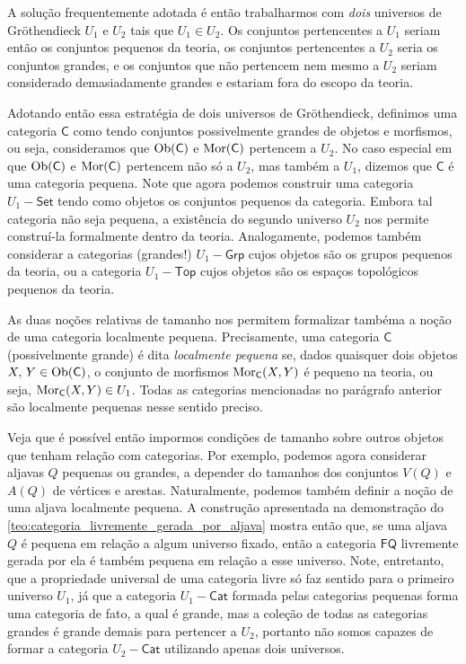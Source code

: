 \begin{obs}
    A solução frequentemente adotada é então trabalharmos com \emph{dois} universos de Gröthendieck $U_1$ e $U_2$ tais que $U_1 \in U_2$.
    Os conjuntos pertencentes a $U_1$ seriam então os conjuntos pequenos da teoria, os conjuntos pertencentes a $U_2$ seria os conjuntos grandes, e os conjuntos que não pertencem nem mesmo a $U_2$ seriam considerado demasiadamente grandes e estariam fora do escopo da teoria.

    Adotando então essa estratégia de dois universos de Gröthendieck, definimos uma categoria $\mathsf{C}$ como tendo conjuntos possivelmente grandes de objetos e morfismos, ou seja, consideramos que $\mathrm{Ob}(\mathsf{C})$ e $\mathrm{Mor}(\mathsf{C})$ pertencem a $U_2$.
    No caso especial em que $\mathrm{Ob}(\mathsf{C})$ e $\mathrm{Mor}(\mathsf{C})$ pertencem não só a $U_2$, mas também a $U_1$, dizemos que $\mathsf{C}$ é uma categoria pequena.
    Note que agora podemos construir uma categoria $U_1-\mathsf{Set}$ tendo como objetos os conjuntos pequenos da categoria.
    Embora tal categoria não seja pequena, a existência do segundo universo $U_2$ nos permite construí-la formalmente dentro da teoria.
    Analogamente, podemos também considerar a categorias (grandes!) $U_1-\mathsf{Grp}$ cujos objetos são os grupos pequenos da teoria, ou a categoria $U_1-\mathsf{Top}$ cujos objetos são os espaços topológicos pequenos da teoria.

    As duas noções relativas de tamanho nos permitem formalizar tambéma a noção de uma categoria localmente pequena.
    Precisamente, uma categoria $\mathsf{C}$ (possivelmente grande) é dita \emph{localmente pequena} se, dados quaisquer dois objetos $X,\, Y \in \mathrm{Ob}(\mathsf{C})$, o conjunto de morfismos $\mathrm{Mor}_{\mathsf{C}}(X,Y)$ é pequeno na teoria, ou seja, $\mathrm{Mor}_{\mathsf{C}}(X,Y) \in U_1$.
    Todas as categorias mencionadas no parágrafo anterior são localmente pequenas nesse sentido preciso.

    Veja que é possível então impormos condições de tamanho sobre outros objetos que tenham relação com categorias.
    Por exemplo, podemos agora considerar aljavas $Q$ pequenas ou grandes, a depender do tamanhos dos conjuntos $V(Q)$ e $A(Q)$ de vértices e arestas.
    Naturalmente, podemos também definir a noção de uma aljava localmente pequena.
    A construção apresentada na demonstração do \cref{teo:categoria_livremente_gerada_por_aljava} mostra então que, se uma aljava $Q$ é pequena em relação a algum universo fixado, então a categoria $\mathsf{FQ}$ livremente gerada por ela é também pequena em relação a esse universo.
    Note, entretanto, que a propriedade universal de uma categoria livre só faz sentido para o primeiro universo $U_1$, já que a categoria $U_1-\mathsf{Cat}$ formada pelas categorias pequenas forma uma categoria de fato, a qual é grande, mas a coleção de todas as categorias grandes é grande demais para pertencer a $U_2$, portanto não somos capazes de formar a categoria $U_2-\mathsf{Cat}$ utilizando apenas dois universos.


\end{obs}
